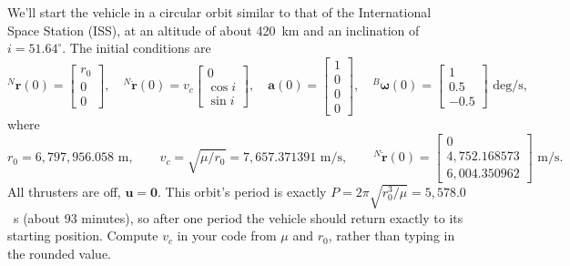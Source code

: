 \documentclass[11pt,letterpaper]{article}
\newcommand{\Bw}{{}^{B}\boldsymbol{\omega}}
\newcommand{\ba}{\mathbf{a}}
\newcommand{\bu}{\mathbf{u}}
\newcommand{\Nr}{{}^{N}\mathbf{r}}
\newcommand{\Nrd}{{}^{N}\dot{\mathbf{r}}}
\begin{document}
We'll start the vehicle in a circular orbit similar to that of the International Space Station (ISS), at an altitude of about 420~km and an inclination of $i = 51.64^\circ$. The initial conditions are
\[
\Nr(0) = \begin{bmatrix} r_0 \\ 0 \\ 0 \end{bmatrix}, \quad
\Nrd(0) = v_c\begin{bmatrix} 0 \\ \cos i \\ \sin i \end{bmatrix}, \quad
\ba(0) = \begin{bmatrix} 1 \\ 0 \\ 0 \\ 0 \end{bmatrix}, \quad
\Bw(0) = \begin{bmatrix} 1 \\ 0.5 \\ -0.5 \end{bmatrix}\text{ deg/s},
\]
where
\[
r_0 = 6{,}797{,}956.058\text{ m}, \qquad v_c = \sqrt{\mu/r_0} = 7{,}657.371391\text{ m/s}, \qquad \Nrd(0) = \begin{bmatrix} 0 \\ 4{,}752.168573 \\ 6{,}004.350962 \end{bmatrix}\text{ m/s}.
\]
All thrusters are off, $\bu = \mathbf{0}$. This orbit's period is exactly $P = 2\pi\sqrt{r_0^3/\mu} = 5{,}578.0$~s (about 93 minutes), so after one period the vehicle should return exactly to its starting position. Compute $v_c$ in your code from $\mu$ and $r_0$, rather than typing in the rounded value.
\end{document}

